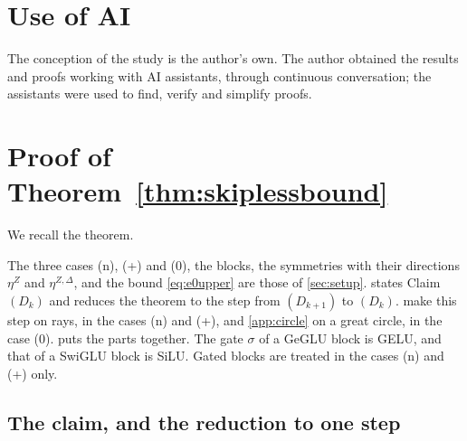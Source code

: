 \documentclass[10pt]{article}
\theoremstyle{definition}
\theoremstyle{remark}
\begin{document}
\section*{Use of AI}
The conception of the study is the author's own. The author obtained the results and proofs working with AI assistants, through continuous conversation; the assistants were used to find, verify and simplify proofs.





\appendix
\section{Proof of Theorem~\ref*{thm:skiplessbound}}\label{app:skiplessbound}\label{app:rmsskipless}\label{app:epszeroskipless}

We recall the theorem.

\thmSkipless*

The three cases (n), (+) and (0), the blocks, the symmetries with their directions $\eta^{Z}$ and $\eta^{Z,\Delta}$, and the bound \eqref{eq:e0upper} are those of \cref{sec:setup}.  states Claim~$(D_k)$ and reduces the theorem to the step from $(D_{k+1})$ to $(D_k)$.  make this step on rays, in the cases (n) and (+), and \cref{app:circle} on a great circle, in the case (0).  puts the parts together. The gate $\sigma$ of a GeGLU block is GELU, and that of a SwiGLU block is SiLU. Gated blocks are treated in the cases (n) and (+) only.

\subsection{The claim, and the reduction to one step}\label{app:claim}
\end{document}
